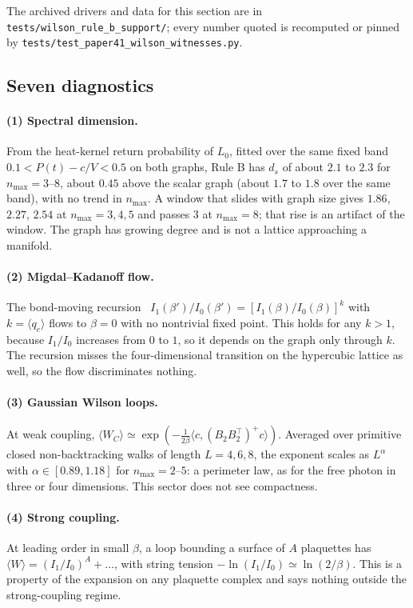 \documentclass[11pt]{article}
\begin{document}
The archived drivers and data for this section are in
\texttt{tests/wilson\_rule\_b\_support/}; every number quoted is recomputed or
pinned by \texttt{tests/test\_paper41\_wilson\_witnesses.py}.

\subsection{Seven diagnostics}

\paragraph{(1) Spectral dimension.}
From the heat-kernel return probability of $L_0$, fitted over the same
fixed band $0.1<P(t)-c/V<0.5$ on both graphs, Rule B has $d_s$ of about
$2.1$ to $2.3$ for $n_{\max}=3$--$8$, about $0.45$ above the scalar graph
(about $1.7$ to $1.8$ over the same band), with no trend in $n_{\max}$.  A window that slides with graph
size gives $1.86$, $2.27$, $2.54$ at $n_{\max}=3,4,5$ and passes $3$ at
$n_{\max}=8$; that rise is an artifact of the window.  The graph has growing
degree and is not a lattice approaching a manifold.

\paragraph{(2) Migdal--Kadanoff flow.}
The bond-moving recursion~\cite{migdal1975,kadanoff1976}
$I_1(\beta')/I_0(\beta')=[I_1(\beta)/I_0(\beta)]^{k}$ with
$k=\langle q_e\rangle$ flows to $\beta=0$ with no nontrivial fixed point.
This holds for any $k>1$, because $I_1/I_0$ increases from $0$ to $1$, so it
depends on the graph only through $k$.  The recursion misses the
four-dimensional transition on the hypercubic lattice as well, so the flow
discriminates nothing.

\paragraph{(3) Gaussian Wilson loops.}
At weak coupling,
$\langle W_C\rangle\simeq\exp(-\frac{1}{2\beta}\langle c,(B_2B_2^{\top})^{+}c\rangle)$.
Averaged over primitive closed non-backtracking walks of length
$L=4,6,8$, the exponent scales as $L^{\alpha}$ with
$\alpha\in[0.89,1.18]$ for $n_{\max}=2$--$5$: a perimeter law, as for the
free photon in three or four dimensions.  This sector does not see
compactness.

\paragraph{(4) Strong coupling.}
At leading order in small $\beta$, a loop bounding a surface of $A$
plaquettes has $\langle W\rangle=(I_1/I_0)^{A}+\ldots$, with string tension
$-\ln(I_1/I_0)\simeq\ln(2/\beta)$.  This is a property of the expansion on
any plaquette complex and says nothing outside the strong-coupling regime.
\end{document}
